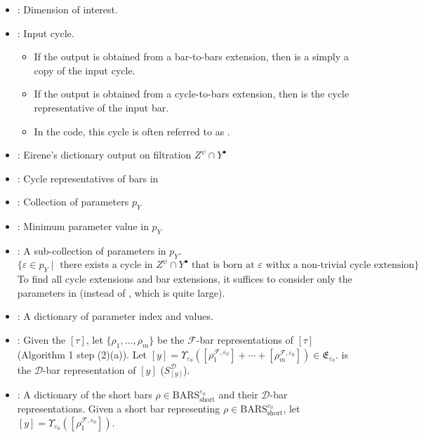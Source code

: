 \documentclass{article}
\begin{document}
\begin{itemize}
\begin{itemize}
	\end{itemize}
\item {}: Dimension of interest.
\item {}: Input cycle.
	\begin{itemize}
	\item If the output is obtained from a bar-to-bars extension, then  is a simply a copy of the input cycle. 
	\item If the output is obtained from a cycle-to-bars extension, then  is the cycle representative of the input bar. 
	\item In the code, this cycle is often referred to as .
	\end{itemize}
 \item {}: Eirene's dictionary output on filtration $Z^{\psi} \cap Y^{\bullet}$
 \item {}: Cycle representatives of bars in 
\item {}: Collection of parameters $p_Y$
\item {}: Minimum parameter value in $p_Y$
\item {}: A sub-collection of parameters in $p_Y$. 
\[\{\varepsilon \in p_Y  \; | \; \text{ there exists a cycle in } Z^{\psi} \cap Y^{\bullet} \text{ that is born at  } \varepsilon \text{ withx a non-trivial cycle extension} \}\]
To find all cycle extensions and bar extensions, it suffices to consider only the parameters in  (instead of , which is quite large).
\item {}: A dictionary of parameter index and values.
\item {}: Given the  $[\tau]$, let $\{\rho_1, \dots, \rho_m \}$ be the $\mathcal{F}$-bar representations of $[\tau]$ (Algorithm 1 step (2)(a)). Let $[y] = \Upsilon_{\varepsilon_0}([\rho_1^{\mathcal{F}, \varepsilon_0}] + \cdots + [\rho_m^{\mathcal{F}, \varepsilon_0}]) \in \mathfrak{E}_{\varepsilon_0}$.  is the $\mathcal{D}$-bar representation of $[y]$ ($S^{\mathcal{D}}_{[y]}$).
\item {}: A dictionary of the short bars $\rho \in \text{BARS}_{\text{short}}^{\varepsilon_0}$ and their $\mathcal{D}$-bar representations. Given a short bar  representing $\rho \in \text{BARS}_{\text{short}}^{\varepsilon_0}$, let $[y] = \Upsilon_{\varepsilon_0}([\rho_1^{\mathcal{F}, \varepsilon_0}]) $. 


\end{itemize}
\end{document}
